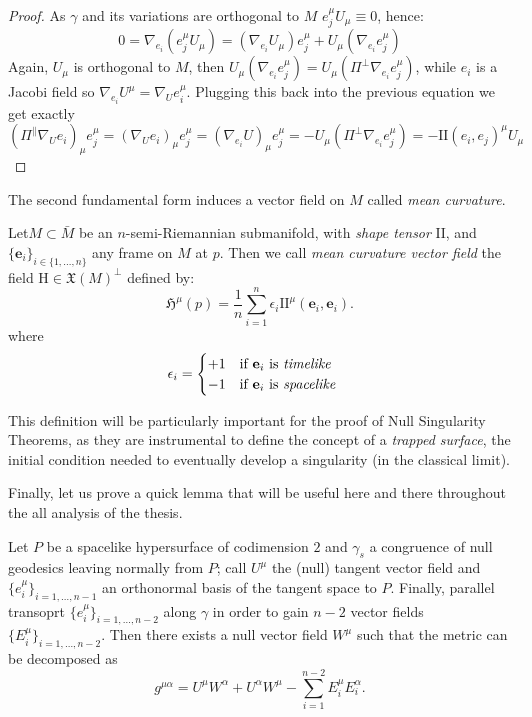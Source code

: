 	\begin{proof}
		As \(\gamma\) and its variations are orthogonal to \(M\) \(e_j^{\mu}U_{\mu} \equiv 0\), hence:
		\[
		0 = \nabla_{e_i}\left(e_j^{\mu}U_{\mu}\right) = \left(\nabla_{e_i}U_{\mu}\right)e_j^{\mu} + U_{\mu}\left(\nabla_{e_i}e_j^{\mu}\right)
		\]
		Again, \(U_{\mu}\) is orthogonal to \(M\), then \(U_{\mu}  \left(\nabla_{e_i}e_j^{\mu}\right)= U_{\mu}\left(\Pi^{\perp}\nabla_{e_i}e_j^{\mu}\right)\), while \(e_i\) is a Jacobi field so \(\nabla_{e_i}U^{\mu} = \nabla_Ue_i^{\mu}\). Plugging this back into the previous equation we get exactly
		\[
		(\Pi^{\parallel}\nabla_Ue_i)_{\mu}e_j^{\mu} = (\nabla_Ue_i)_{\mu}e_j^{\mu} = (\nabla_{e_i}U)_{\mu} e_j^{\mu} = - U_{\mu}\left(\Pi^{\perp}\nabla_{e_i}e_j^{\mu}\right) = - \mathrm{I\!I}(e_i, e_j)^{\mu}U_{\mu}
		\]
	\end{proof}


The second fundamental form induces a vector field on \(M\) called \emph{mean curvature}.


\begin{definition}
		Let\(M \subset \bar{M}\) be an  \(n\)-semi-Riemannian submanifold, with \emph{shape tensor} \(\mathrm{I\!I}\), and \(\{\textbf{e}_i\}_{i \in \{1, \ldots, n\}}\) any frame on \(M\) at \(p\). Then we call \emph{mean curvature vector field} the field \(\mathrm{H} \in \mathfrak{X}(M)^{\perp} \) defined by:
		\[
		\mathfrak{H}^{\mu}(p) = \frac{1}{n} \sum_{i=1}^{n} \epsilon_i \mathrm{I\!I}^{\mu}(\textbf{e}_i, \textbf{e}_i).
		\]
		where 
		\[
		\epsilon_i = 
		\begin{cases}
		+1 \quad \text{if } \textbf{e}_i \text{ is \emph{timelike}} \\
		-1 \quad \text{if } \textbf{e}_i \text{ is \emph{spacelike}}
		\end{cases}
		\]
\end{definition}

This definition will be particularly important for the proof of Null Singularity Theorems, as they are instrumental to define the concept of a \emph{trapped surface}, the initial condition needed to eventually develop a singularity (in the classical limit). 

Finally, let us prove a quick lemma that will be useful here and there throughout the all analysis of the thesis.
\begin{lemma}
	\label{lemma:metric-decomposition}
	Let \(P\) be a spacelike hypersurface of codimension \(2\) and \(\gamma_s\) a congruence of null geodesics leaving normally from \(P\); call \(U^{\mu}\) the (null) tangent vector field and \(\{e_i^{\mu}\}_{i = 1, \ldots, n - 1}\) an orthonormal basis of the tangent space to \(P\). Finally, parallel transoprt \(\{e_i^{\mu}\}_{i = 1, \ldots, n - 2}\) along \(\gamma\) in order to gain \(n - 2\) vector fields \(\{E_i^{\mu}\}_{i = 1, \ldots, n - 2}\). Then there exists a null vector field \(W^{\mu}\) such that the metric can be decomposed as
	\begin{equation}
		g^{\mu\alpha} = U^{\mu}W^{\alpha} + U^{\alpha}W^{\mu} - \sum_{i=1}^{n - 2}E_i^{\mu}E_i^{\alpha}.
	\end{equation}
\end{lemma}

